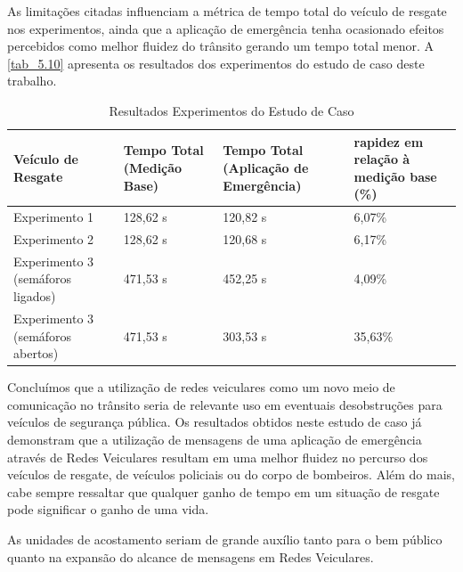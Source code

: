 \documentclass[
12pt,				%
openright,			%
oneside,			%
a4paper,			%
brazil,				%
]{abntex2}
\begin{document}
	\par As limitações citadas influenciam a métrica de tempo total do veículo de resgate nos experimentos, ainda que a aplicação de emergência tenha ocasionado efeitos percebidos como  melhor fluidez do trânsito gerando um tempo total menor. A \autoref{tab_5.10} apresenta os resultados dos experimentos do estudo de caso deste trabalho.
	
	\begin{table}[H]
		\centering
		\renewcommand{\arraystretch}{1.5}
		\begin{tabular}{|p{3.5cm}|p{3.0cm}|p{3.1cm}|p{4.0cm}|}
			\hline
			\textbf{Veículo de \newline Resgate} & \textbf{Tempo Total} (Medição Base) & \textbf{Tempo Total} \newline (Aplicação de Emergência) & \textbf{rapidez em relação \newline à medição base} (\%) \\ \hline
			Experimento 1 & 128,62 s & 120,82 s & 6,07\% \\ \hline
			Experimento 2 & 128,62 s & 120,68 s & 6,17\% \\ \hline
			Experimento 3 \newline (semáforos ligados) & 471,53 s & 452,25 s & 4,09\% \\ \hline
			Experimento 3 \newline (semáforos abertos) & 471,53 s & 303,53 s & 35,63\% \\ \hline
		\end{tabular}
		\caption{Resultados Experimentos do Estudo de Caso}
		\label{tab_5.10}
	\end{table}
	
	\par Concluímos que a utilização de redes veiculares como um novo meio de comunicação no trânsito seria de relevante uso em eventuais desobstruções para veículos de segurança pública. Os resultados obtidos neste estudo de caso já demonstram que a utilização de mensagens de uma aplicação de emergência através de Redes Veiculares resultam em uma melhor fluidez no percurso dos veículos de resgate, de veículos policiais ou do corpo de bombeiros. Além do mais, cabe sempre ressaltar que qualquer ganho de tempo em um situação de resgate pode significar o ganho de uma vida.
	
	\par As unidades de acostamento seriam de grande auxílio tanto para o bem público quanto na expansão do alcance de mensagens em Redes Veiculares. 
	
\end{document}
